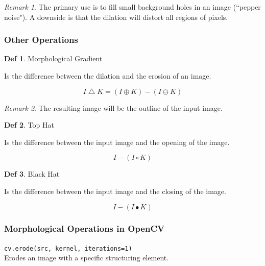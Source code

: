 \documentclass{article}
\theoremstyle{definition}
\newtheorem{df}{Def}
\theoremstyle{remark}
\newtheorem*{rem}{Remark}
\newcommand{\func}[2]{\noindent\lstinline{#1}\\#2}
\begin{document}
\begin{rem}
    The primary use is to fill small background holes in an image (``pepper noise"). A downside is that the dilation will distort all regions of pixels.
\end{rem}



\subsubsection{Other Operations}

\begin{df}Morphological Gradient

Is the difference between the dilation and the erosion of an image.

\begin{equation}
    I \bigtriangleup K = (I \oplus K) - (I \ominus K)
\end{equation}

\end{df}

\begin{rem}
    The resulting image will be the outline of the input image.
\end{rem}


\begin{df}Top Hat

Is the difference between the input image and the opening of the image.

\begin{equation}
    I - (I \circ K)
\end{equation}

\end{df}

\begin{df}Black Hat

Is the difference between the input image and the closing of the image.

\begin{equation}
    I - (I \bullet K)
\end{equation}

\end{df}

\subsubsection{Morphological Operations in OpenCV}


\func{cv.erode(src, kernel, iterations=1)}{Erodes an image with a specific structuring element.}
\end{document}
